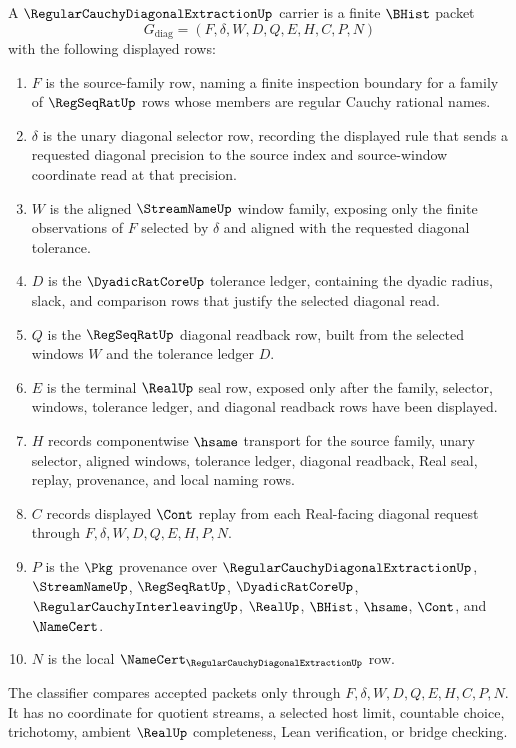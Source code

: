 \begin{definition}
\label{def:regular-cauchy-diagonal-extraction-carrier}
A $\RegularCauchyDiagonalExtractionUp$ carrier is a finite $\BHist$ packet
$$
G_{\mathrm{diag}}=(F,\delta,W,D,Q,E,H,C,P,N)
$$
with the following displayed rows:
\begin{enumerate}
\item $F$ is the source-family row, naming a finite inspection boundary for a family of $\RegSeqRatUp$ rows whose members are regular Cauchy rational names.
\item $\delta$ is the unary diagonal selector row, recording the displayed rule that sends a requested diagonal precision to the source index and source-window coordinate read at that precision.
\item $W$ is the aligned $\StreamNameUp$ window family, exposing only the finite observations of $F$ selected by $\delta$ and aligned with the requested diagonal tolerance.
\item $D$ is the $\DyadicRatCoreUp$ tolerance ledger, containing the dyadic radius, slack, and comparison rows that justify the selected diagonal read.
\item $Q$ is the $\RegSeqRatUp$ diagonal readback row, built from the selected windows $W$ and the tolerance ledger $D$.
\item $E$ is the terminal $\RealUp$ seal row, exposed only after the family, selector, windows, tolerance ledger, and diagonal readback rows have been displayed.
\item $H$ records componentwise $\hsame$ transport for the source family, unary selector, aligned windows, tolerance ledger, diagonal readback, Real seal, replay, provenance, and local naming rows.
\item $C$ records displayed $\Cont$ replay from each Real-facing diagonal request through $F,\delta,W,D,Q,E,H,P,N$.
\item $P$ is the $\Pkg$ provenance over $\RegularCauchyDiagonalExtractionUp$, $\StreamNameUp$, $\RegSeqRatUp$, $\DyadicRatCoreUp$, $\RegularCauchyInterleavingUp$, $\RealUp$, $\BHist$, $\hsame$, $\Cont$, and $\NameCert$.
\item $N$ is the local $\NameCert_{\RegularCauchyDiagonalExtractionUp}$ row.
\end{enumerate}
The classifier compares accepted packets only through $F,\delta,W,D,Q,E,H,C,P,N$. It has no coordinate for quotient streams, a selected host limit, countable choice, trichotomy, ambient $\RealUp$ completeness, Lean verification, or bridge checking.
\end{definition}

